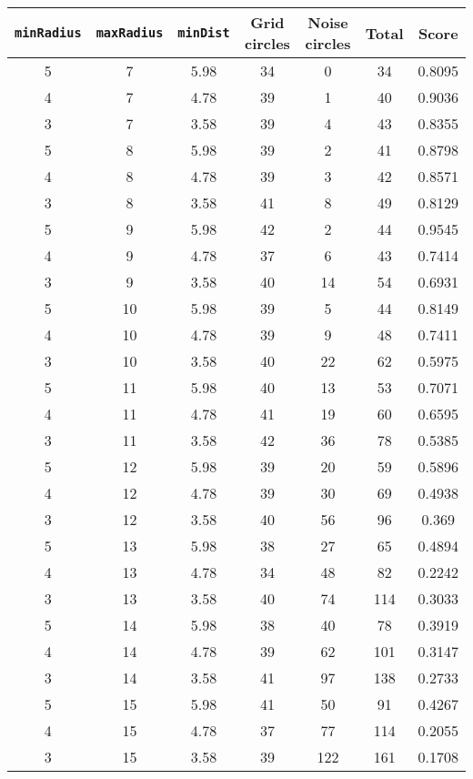 \documentclass[letterpaper, 12pt]{article}
\begin{document}
\begin{longtable}{|c|c|c|c|c|c|c|}
\hline
\textbf{\texttt{minRadius}} & \textbf{\texttt{maxRadius}} & \textbf{\texttt{minDist}} & \textbf{Grid circles} & \textbf{Noise circles} & \textbf{Total} & \textbf{Score} \\
\hline
5 & 7 & 5.98 & 34 & 0 & 34 & 0.8095 \\
\hline
4 & 7 & 4.78 & 39 & 1 & 40 & 0.9036 \\
\hline
3 & 7 & 3.58 & 39 & 4 & 43 & 0.8355 \\
\hline
5 & 8 & 5.98 & 39 & 2 & 41 & 0.8798 \\
\hline
4 & 8 & 4.78 & 39 & 3 & 42 & 0.8571 \\
\hline
3 & 8 & 3.58 & 41 & 8 & 49 & 0.8129 \\
\hline
5 & 9 & 5.98 & 42 & 2 & 44 & 0.9545 \\
\hline
4 & 9 & 4.78 & 37 & 6 & 43 & 0.7414 \\
\hline
3 & 9 & 3.58 & 40 & 14 & 54 & 0.6931 \\
\hline
5 & 10 & 5.98 & 39 & 5 & 44 & 0.8149 \\
\hline
4 & 10 & 4.78 & 39 & 9 & 48 & 0.7411 \\
\hline
3 & 10 & 3.58 & 40 & 22 & 62 & 0.5975 \\
\hline
5 & 11 & 5.98 & 40 & 13 & 53 & 0.7071 \\
\hline
4 & 11 & 4.78 & 41 & 19 & 60 & 0.6595 \\
\hline
3 & 11 & 3.58 & 42 & 36 & 78 & 0.5385 \\
\hline
5 & 12 & 5.98 & 39 & 20 & 59 & 0.5896 \\
\hline
4 & 12 & 4.78 & 39 & 30 & 69 & 0.4938 \\
\hline
3 & 12 & 3.58 & 40 & 56 & 96 & 0.369 \\
\hline
5 & 13 & 5.98 & 38 & 27 & 65 & 0.4894 \\
\hline
4 & 13 & 4.78 & 34 & 48 & 82 & 0.2242 \\
\hline
3 & 13 & 3.58 & 40 & 74 & 114 & 0.3033 \\
\hline
5 & 14 & 5.98 & 38 & 40 & 78 & 0.3919 \\
\hline
4 & 14 & 4.78 & 39 & 62 & 101 & 0.3147 \\
\hline
3 & 14 & 3.58 & 41 & 97 & 138 & 0.2733 \\
\hline
5 & 15 & 5.98 & 41 & 50 & 91 & 0.4267 \\
\hline
4 & 15 & 4.78 & 37 & 77 & 114 & 0.2055 \\
\hline
3 & 15 & 3.58 & 39 & 122 & 161 & 0.1708 \\

\end{longtable}
\end{document}
